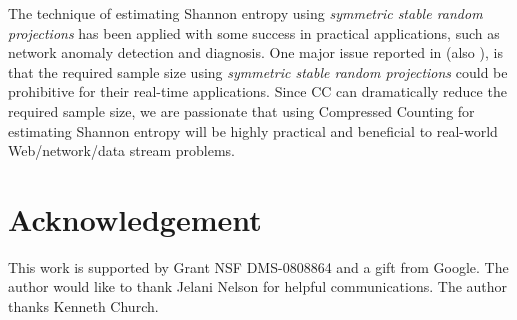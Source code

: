 \documentclass{sig-alternate}
\begin{document}
The technique of estimating Shannon entropy using {\em symmetric stable random projections} has been applied with some success in practical applications, such as  network anomaly detection and diagnosis\cite{Proc:Zhao_IMC07}. One major issue reported in \cite{Proc:Zhao_IMC07} (also \cite{Proc:Ganguly_RANDOM07}), is that the required sample size using {\em symmetric stable random projections} could be prohibitive for their real-time applications. Since CC can dramatically reduce the required sample size, we are passionate that  using Compressed Counting for estimating Shannon entropy will be highly practical and beneficial to real-world Web/network/data stream problems.


\section*{Acknowledgement}
This work is supported by Grant NSF DMS-0808864 and a gift from Google. The author would like to thank Jelani Nelson for  helpful communications. The author thanks Kenneth Church.
\end{document}

